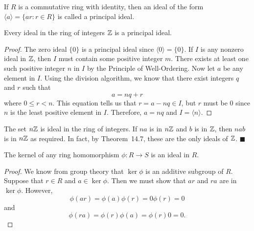  
\vspace{2ex}
 
 
If $R$ is a commutative ring with identity, then an ideal of the form
$\langle a \rangle  = \{ ar : r \in R \}$  is called a {\bfi principal
ideal}.  
 
 
\begin{theorem}
Every ideal in the ring of integers ${\Bbb Z}$ is a principal ideal.
\end{theorem}
 
 
\begin{proof}
The zero ideal $\{ 0 \}$ is a principal ideal since $\langle 0
\rangle = \{ 0 \}$. If  $I$ is any nonzero ideal in ${\Bbb Z}$, then 
$I$ must contain some positive integer $m$.  There exists at least one
such positive integer $n$ in $I$ by the Principle of Well-Ordering. 
Now let $a$ be any element in $I$. Using the division algorithm, we 
know that there exist integers $q$ and $r$ such that 
\[
a = nq + r
\]
where $0 \leq r < n$. This equation tells us that $r = a - nq \in I$,
but $r$ must be $0$ since $n$ is the least positive element in $I$.
Therefore, $a = nq$ and $I = \langle n \rangle$.
\mbox{\hspace*{1in}}
\end{proof}
 
 
\vspace{2ex}
 
 
The set $n {\Bbb Z}$ is ideal in the ring of integers. If $na$ is in
$n{\Bbb Z}$ and $b$ is in ${\Bbb Z}$, then $nab$ is in  $n {\Bbb Z}$
as required. In fact, by Theorem~14.7, these are the only
ideals of ${\Bbb Z}$.
\hspace{\fill} $\blacksquare$
 
 
\begin{proposition}
The kernel of any ring homomorphism $\phi : R \rightarrow S$ is an
ideal in $R$. 
\end{proposition}
 
 
\begin{proof}
We know from group theory that $\ker \phi$ is an additive subgroup of
$R$. Suppose that $r \in R$ and $a \in \ker \phi$. Then we must show
that $ar$ and $ra$ are in $\ker \phi$. However, 
\[
\phi(ar) = \phi(a) \phi(r) = 0 \phi(r) = 0
\]
and 
\[
\phi(ra) = \phi(r) \phi(a) =  \phi(r)0 = 0.
\]
\end{proof}
 
 
\vspace{2ex}
 
